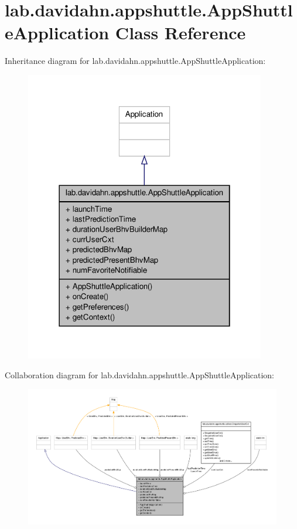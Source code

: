 \hypertarget{classlab_1_1davidahn_1_1appshuttle_1_1_app_shuttle_application}{\section{lab.\-davidahn.\-appshuttle.\-App\-Shuttle\-Application \-Class \-Reference}
\label{classlab_1_1davidahn_1_1appshuttle_1_1_app_shuttle_application}
}


\-Inheritance diagram for lab.\-davidahn.\-appshuttle.\-App\-Shuttle\-Application\-:
\nopagebreak
\begin{figure}[H]
\begin{center}
\leavevmode
\includegraphics[width=298pt]{classlab_1_1davidahn_1_1appshuttle_1_1_app_shuttle_application__inherit__graph}
\end{center}
\end{figure}


\-Collaboration diagram for lab.\-davidahn.\-appshuttle.\-App\-Shuttle\-Application\-:
\nopagebreak
\begin{figure}[H]
\begin{center}
\leavevmode
\includegraphics[width=350pt]{classlab_1_1davidahn_1_1appshuttle_1_1_app_shuttle_application__coll__graph}
\end{center}
\end{figure}
